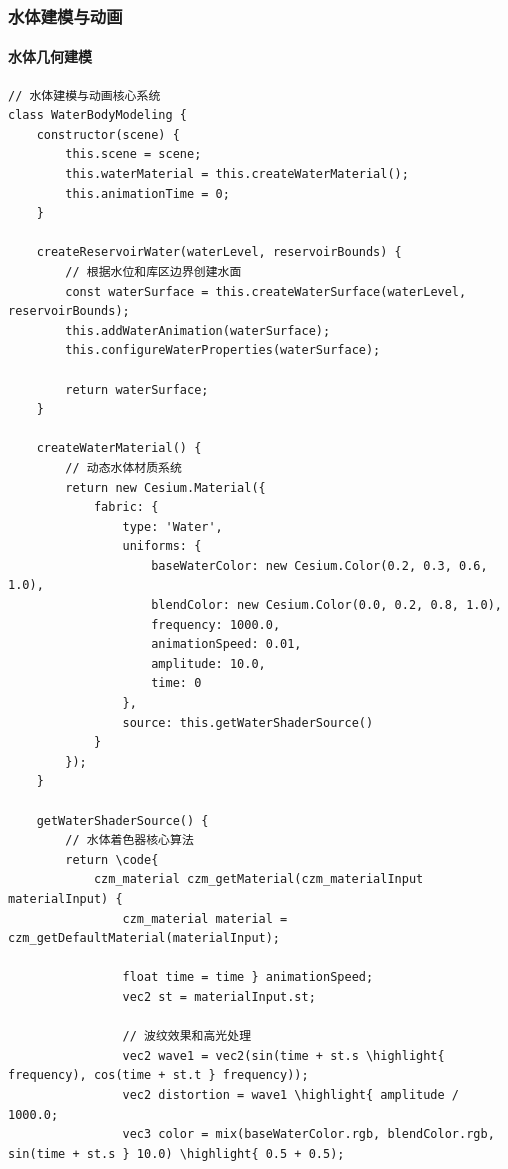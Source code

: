 \hypertarget{ux6c34ux4f53ux5efaux6a21ux4e0eux52a8ux753b}{%
\subsubsection{水体建模与动画}\label{ux6c34ux4f53ux5efaux6a21ux4e0eux52a8ux753b}}

\hypertarget{ux6c34ux4f53ux51e0ux4f55ux5efaux6a21}{%
\paragraph{水体几何建模}\label{ux6c34ux4f53ux51e0ux4f55ux5efaux6a21}}

\begin{lstlisting}[style=javascript]
// 水体建模与动画核心系统
class WaterBodyModeling {
    constructor(scene) {
        this.scene = scene;
        this.waterMaterial = this.createWaterMaterial();
        this.animationTime = 0;
    }
    
    createReservoirWater(waterLevel, reservoirBounds) {
        // 根据水位和库区边界创建水面
        const waterSurface = this.createWaterSurface(waterLevel, reservoirBounds);
        this.addWaterAnimation(waterSurface);
        this.configureWaterProperties(waterSurface);
        
        return waterSurface;
    }
    
    createWaterMaterial() {
        // 动态水体材质系统
        return new Cesium.Material({
            fabric: {
                type: 'Water',
                uniforms: {
                    baseWaterColor: new Cesium.Color(0.2, 0.3, 0.6, 1.0),
                    blendColor: new Cesium.Color(0.0, 0.2, 0.8, 1.0),
                    frequency: 1000.0,
                    animationSpeed: 0.01,
                    amplitude: 10.0,
                    time: 0
                },
                source: this.getWaterShaderSource()
            }
        });
    }
    
    getWaterShaderSource() {
        // 水体着色器核心算法
        return \code{
            czm_material czm_getMaterial(czm_materialInput materialInput) {
                czm_material material = czm_getDefaultMaterial(materialInput);
                
                float time = time } animationSpeed;
                vec2 st = materialInput.st;
                
                // 波纹效果和高光处理
                vec2 wave1 = vec2(sin(time + st.s \highlight{ frequency), cos(time + st.t } frequency));
                vec2 distortion = wave1 \highlight{ amplitude / 1000.0;
                vec3 color = mix(baseWaterColor.rgb, blendColor.rgb, sin(time + st.s } 10.0) \highlight{ 0.5 + 0.5);
                

\end{lstlisting}
